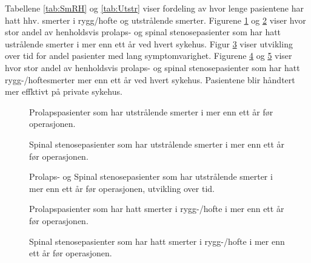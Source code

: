 Tabellene \ref{tab:SmRH}  og \ref{tab:Utstr} viser fordeling av hvor lenge pasientene har hatt 
hhv. smerter i rygg/hofte og utstrålende smerter. 
Figurene \ref{fig:VarighSmerteUtstrAvdPro} og \ref{fig:VarighSmerteUtstrAvdSS} viser hvor stor andel av henholdsvis prolaps- og spinal stenosepasienter som har hatt ustrålende smerter i mer enn ett år ved hvert sykehus.
Figur \ref{fig:VarighSmerteUtstrTid} viser utvikling over tid for andel pasienter med lang symptomvarighet.
Figurene \ref{fig:VarighSmerteRyggAvdPro} og \ref{fig:VarighSmerteRyggAvdSS} viser hvor stor andel av henholdsvis prolaps- og spinal stenosepasienter som har hatt rygg-/hoftesmerter mer enn ett år ved hvert sykehus. Pasientene blir håndtert mer effktivt på private sykehus.

\begin{figure}[h] 
\caption{Prolapspasienter som har utstrålende smerter i mer enn ett år før operasjonen.}
\label{fig:VarighSmerteUtstrAvdPro}
\end{figure}

\begin{figure}[h] 
\caption{Spinal stenosepasienter som har utstrålende smerter i mer enn ett år før operasjonen.}
\label{fig:VarighSmerteUtstrAvdSS}
\end{figure}



\begin{figure}[h] 
\caption{Prolaps- og Spinal stenosepasienter som har utstrålende smerter i mer enn ett år før operasjonen, utvikling over tid.}
\label{fig:VarighSmerteUtstrTid}
\end{figure}



\begin{figure}[h] 
\caption{Prolapspasienter som har hatt smerter i rygg-/hofte
i mer enn ett år før operasjonen.}
\label{fig:VarighSmerteRyggAvdPro}
\end{figure}

\begin{figure}[h] 
\caption{Spinal stenosepasienter som har hatt smerter i rygg-/hofte
i mer enn ett år før operasjonen.}
\label{fig:VarighSmerteRyggAvdSS}
\end{figure}




